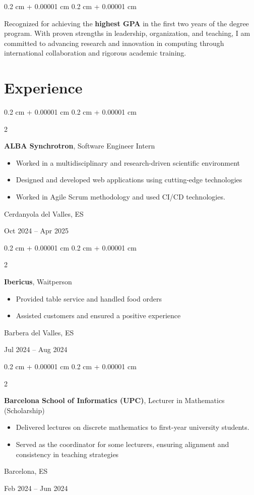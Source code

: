 \documentclass[10pt, letterpaper]{article}
\newenvironment{highlights}{
    \begin{itemize}[
        topsep=0.10 cm,
        parsep=0.10 cm,
        partopsep=0pt,
        itemsep=0pt,
        leftmargin=0.4 cm + 10pt
    ]
}{
    \end{itemize}
} %
\newenvironment{onecolentry}{
    \begin{adjustwidth}{
        0.2 cm + 0.00001 cm
    }{
        0.2 cm + 0.00001 cm
    }
}{
    \end{adjustwidth}
} %
\newenvironment{twocolentry}[2][]{
    \onecolentry
    \def\secondColumn{#2}
    \setcolumnwidth{\fill, 4.5 cm}
    \begin{paracol}{2}
}{
    \switchcolumn \raggedleft \secondColumn
    \end{paracol}
    \endonecolentry
} %
\begin{document}
        \begin{onecolentry}
            Recognized for achieving the \textbf{highest GPA} in the first two years of the degree program. With proven strengths in leadership, organization, and teaching, I am committed to advancing research and innovation in computing through international collaboration and rigorous academic training.
        \end{onecolentry}


    \section{Experience}
        \begin{twocolentry}{
            Cerdanyola del Valles, ES

            Oct 2024 – Apr 2025
        }
            \textbf{ALBA Synchrotron}, Software Engineer Intern
            \begin{highlights}
                \item Worked in a multidisciplinary and research-driven scientific environment
                \item Designed and developed web applications using cutting-edge technologies
                \item Worked in Agile Scrum methodology and used CI/CD technologies.
            \end{highlights}
        \end{twocolentry}

        \vspace{0.2 cm}

        \begin{twocolentry}{
            Barbera del Valles, ES

            Jul 2024 – Aug 2024
        }
            \textbf{Ibericus}, Waitperson
            \begin{highlights}
                \item Provided table service and handled food orders
                \item Assisted customers and ensured a positive experience
            \end{highlights}
        \end{twocolentry}

        \vspace{0.2 cm}

        \begin{twocolentry}{
            Barcelona, ES

            Feb 2024 – Jun 2024
        }
            \textbf{Barcelona School of Informatics (UPC)}, Lecturer in Mathematics (Scholarship)
            \begin{highlights}
                \item Delivered lectures on discrete mathematics to first-year university students.
                \item Served as the coordinator for some lecturers, ensuring alignment and consistency in teaching strategies
            \end{highlights}
        \end{twocolentry}
\end{document}
